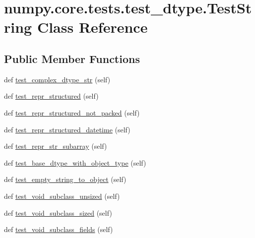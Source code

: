 \hypertarget{classnumpy_1_1core_1_1tests_1_1test__dtype_1_1TestString}{}\section{numpy.\+core.\+tests.\+test\+\_\+dtype.\+Test\+String Class Reference}
\label{classnumpy_1_1core_1_1tests_1_1test__dtype_1_1TestString}
\subsection*{Public Member Functions}
\begin{DoxyCompactItemize}
\item 
def \hyperlink{classnumpy_1_1core_1_1tests_1_1test__dtype_1_1TestString_a48c76b847d79f9ca45d07d84c72833ba}{test\+\_\+complex\+\_\+dtype\+\_\+str} (self)
\item 
def \hyperlink{classnumpy_1_1core_1_1tests_1_1test__dtype_1_1TestString_a5b69a86db6fd4a998c5f5b5bf8d1afe4}{test\+\_\+repr\+\_\+structured} (self)
\item 
def \hyperlink{classnumpy_1_1core_1_1tests_1_1test__dtype_1_1TestString_a06beb88cd57ed1445131d3a027066c01}{test\+\_\+repr\+\_\+structured\+\_\+not\+\_\+packed} (self)
\item 
def \hyperlink{classnumpy_1_1core_1_1tests_1_1test__dtype_1_1TestString_ae252542d0d45f1d0849d9f925b2631d6}{test\+\_\+repr\+\_\+structured\+\_\+datetime} (self)
\item 
def \hyperlink{classnumpy_1_1core_1_1tests_1_1test__dtype_1_1TestString_a80464194a92fe159288f4defce8acbee}{test\+\_\+repr\+\_\+str\+\_\+subarray} (self)
\item 
def \hyperlink{classnumpy_1_1core_1_1tests_1_1test__dtype_1_1TestString_ae09ebe20e842ac1058688879fbbfc04d}{test\+\_\+base\+\_\+dtype\+\_\+with\+\_\+object\+\_\+type} (self)
\item 
def \hyperlink{classnumpy_1_1core_1_1tests_1_1test__dtype_1_1TestString_a8cb86e2347e69028ae27fcd2d19494f0}{test\+\_\+empty\+\_\+string\+\_\+to\+\_\+object} (self)
\item 
def \hyperlink{classnumpy_1_1core_1_1tests_1_1test__dtype_1_1TestString_ab4d8b25def1d539ebc54aa4f426d6bc0}{test\+\_\+void\+\_\+subclass\+\_\+unsized} (self)
\item 
def \hyperlink{classnumpy_1_1core_1_1tests_1_1test__dtype_1_1TestString_a50bb37088275c286b606ee16330d5543}{test\+\_\+void\+\_\+subclass\+\_\+sized} (self)
\item 
def \hyperlink{classnumpy_1_1core_1_1tests_1_1test__dtype_1_1TestString_ae7024dedbd344b8f909ae0c7b8a53e90}{test\+\_\+void\+\_\+subclass\+\_\+fields} (self)
\end{DoxyCompactItemize}


